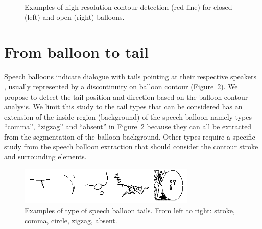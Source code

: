 
	\begin{figure}[!ht]	%
	  \centering
		\caption[Examples of high resolution contour detection for balloon extraction]{Examples of high resolution contour detection (red line) for closed (left) and open (right) balloons.}
		\label{fig:se:hd_contour}
	\end{figure}



\section{From balloon to tail} %
\label{sec:se:from_balloon_to_tail}

Speech balloons indicate dialogue with tails pointing at their respective speakers~\cite{Varnum2007Language}
, usually represented by a discontinuity on balloon contour (Figure~\ref{fig:se:tail_types}). 
We propose to detect the tail position and direction based on the balloon contour analysis.
We limit this study to the tail types that can be considered has an extension of the inside region (background) of the speech balloon namely types ``comma'', ``zigzag'' and ``absent'' in Figure~\ref{fig:se:tail_types} because they can all be extracted from the segmentation of the balloon background.
Other types require a specific study from the speech balloon extraction that should consider the contour stroke and surrounding elements.

    \begin{figure}[ht]%
      \centering
      \includegraphics[trim= 0px 0px 0mm 0mm, clip, width=0.75\textwidth]{tail_types.png}
    \caption[Examples of type of speech balloon tails]{Examples of type of speech balloon tails. From left to right: stroke, comma, circle, zigzag, absent.}
    \label{fig:se:tail_types}
    \end{figure}

